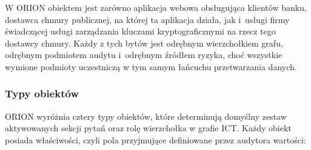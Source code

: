 W ORION obiektem jest zarówno aplikacja webowa obsługująca klientów banku, dostawca chmury publicznej, na której ta aplikacja działa, jak i~usługi firmy
 świadczącej usługi zarządzania kluczami kryptograficznymi na rzecz tego dostawcy chmury. Każdy z tych 
bytów jest odrębnym wierzchołkiem grafu, odrębnym podmiotem  audytu i~odrębnym źródłem ryzyka, choć wszystkie wymione podmioty uczestniczą w tym samym łańcuchu przetwarzania danych.

\subsubsection{Typy obiektów}

ORION wyróżnia cztery typy obiektów, które determinują domyślny zestaw aktywowanych sekcji pytań oraz rolę wierzchołka w grafie ICT.
Każdy obiekt posiada właściwości, czyli pola przyjmujące definiowane przez audytora wartości:

